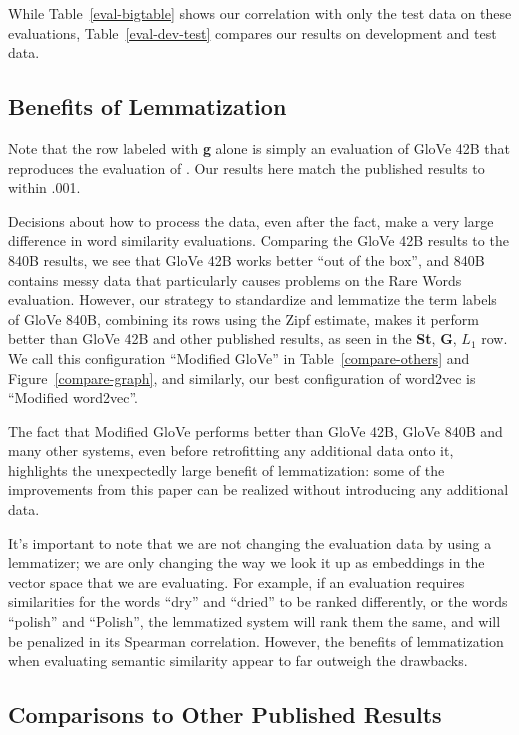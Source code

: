 \documentclass[11pt,letterpaper]{article}
\begin{document}
While Table~\ref{eval-bigtable} shows our correlation with only the test data on
these evaluations, Table~\ref{eval-dev-test} compares our results on
development and test data.

\subsection{Benefits of Lemmatization}

Note that the row labeled with {\bf g} alone is simply an evaluation of GloVe
42B that reproduces the evaluation of . Our results
here match the published results to within .001.

Decisions about how to process the data, even after
the fact, make a very large difference in word similarity evaluations.
Comparing the GloVe 42B results to the 840B results, we see that GloVe 42B
works better ``out of the box'', and 840B contains messy data that particularly
causes problems on the Rare Words evaluation. However, our strategy to
standardize and lemmatize the term labels of GloVe 840B, combining its rows using
the Zipf estimate, makes it perform better than GloVe 42B and other published
results, as seen in the {\bf St}, {\bf G}, $L_1$ row. We call this
configuration ``Modified GloVe'' in Table~\ref{compare-others} and Figure~\ref{compare-graph},
and similarly, our best configuration of word2vec is ``Modified word2vec''.

The fact that Modified GloVe performs better than GloVe 42B, GloVe 840B and many
other systems, even before retrofitting any additional data onto it, highlights
the unexpectedly large benefit of lemmatization: some of the improvements from
this paper can be realized without introducing any additional data.

It's important to note that we are not changing the evaluation data by using
a lemmatizer; we are only changing the way we look it up as embeddings in the
vector space that we are evaluating.
For example, if an evaluation requires
similarities for the words ``dry'' and ``dried'' to be ranked differently, or
the words ``polish'' and ``Polish'', the lemmatized system will rank them the
same, and will be penalized in its Spearman correlation.
However, the benefits of lemmatization when evaluating semantic similarity
appear to far outweigh the drawbacks.

\subsection{Comparisons to Other Published Results}
\end{document}
